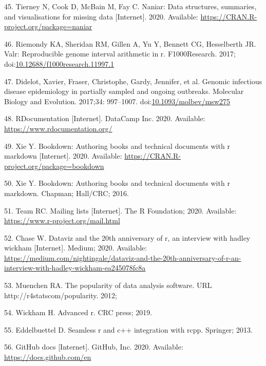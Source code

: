 \documentclass[10pt,letterpaper]{article}
\begin{document}
\leavevmode\hypertarget{ref-naniar}{}%
45. Tierney N, Cook D, McBain M, Fay C. Naniar: Data structures,
summaries, and visualisations for missing data {[}Internet{]}. 2020.
Available: \url{https://CRAN.R-project.org/package=naniar}

\leavevmode\hypertarget{ref-valr}{}%
46. Riemondy KA, Sheridan RM, Gillen A, Yu Y, Bennett CG, Hesselberth
JR. Valr: Reproducible genome interval arithmetic in r. F1000Research.
2017;
doi:\href{https://doi.org/10.12688/f1000research.11997.1}{10.12688/f1000research.11997.1}

\leavevmode\hypertarget{ref-TransPhylo}{}%
47. Didelot, Xavier, Fraser, Christophe, Gardy, Jennifer, et al. Genomic
infectious disease epidemiology in partially sampled and ongoing
outbreaks. Molecular Biology and Evolution. 2017;34: 997--1007.
doi:\href{https://doi.org/10.1093/molbev/msw275}{10.1093/molbev/msw275}

\leavevmode\hypertarget{ref-rdocumentation}{}%
48. RDocumentation {[}Internet{]}. DataCamp Inc. 2020. Available:
\url{https://www.rdocumentation.org/}

\leavevmode\hypertarget{ref-bookdown}{}%
49. Xie Y. Bookdown: Authoring books and technical documents with r
markdown {[}Internet{]}. 2020. Available:
\url{https://CRAN.R-project.org/package=bookdown}

\leavevmode\hypertarget{ref-xie2016}{}%
50. Xie Y. Bookdown: Authoring books and technical documents with r
markdown. Chapman; Hall/CRC; 2016.

\leavevmode\hypertarget{ref-Rmail2020}{}%
51. Team RC. Mailing lists {[}Internet{]}. The R Foundation; 2020.
Available: \url{https://www.r-project.org/mail.html}

\leavevmode\hypertarget{ref-chase2020}{}%
52. Chase W. Dataviz and the 20th anniversary of r, an interview with
hadley wickham {[}Internet{]}. Medium; 2020. Available:
\url{https://medium.com/nightingale/dataviz-and-the-20th-anniversary-of-r-an-interview-with-hadley-wickham-ea245078fc8a}

\leavevmode\hypertarget{ref-muenchen2012}{}%
53. Muenchen RA. The popularity of data analysis software. URL
http://r4statscom/popularity. 2012;

\leavevmode\hypertarget{ref-wickham2019}{}%
54. Wickham H. Advanced r. CRC press; 2019.

\leavevmode\hypertarget{ref-eddelbuettel2013}{}%
55. Eddelbuettel D. Seamless r and c++ integration with rcpp. Springer;
2013.

\leavevmode\hypertarget{ref-githubdocs}{}%
56. GitHub docs {[}Internet{]}. GitHub, Inc. 2020. Available:
\url{https://docs.github.com/en}
\end{document}
